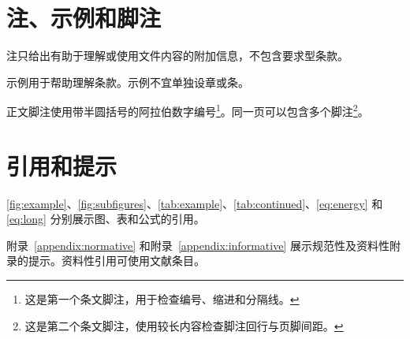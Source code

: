 \section{注、示例和脚注}
注只给出有助于理解或使用文件内容的附加信息，不包含要求型条款。

示例用于帮助理解条款。示例不宜单独设章或条。

正文脚注使用带半圆括号的阿拉伯数字编号\footnote{这是第一个条文脚注，用于检查编号、缩进和分隔线。}。同一页可以包含多个脚注\footnote{这是第二个条文脚注，使用较长内容检查脚注回行与页脚间距。}。

\section{引用和提示}
\ref{fig:example}、\ref{fig:subfigures}、\ref{tab:example}、\ref{tab:continued}、\eqref{eq:energy} 和 \eqref{eq:long} 分别展示图、表和公式的引用。

附录~\ref{appendix:normative} 和附录~\ref{appendix:informative} 展示规范性及资料性附录的提示。资料性引用可使用文献条目\cite{lamport1994latex}。

